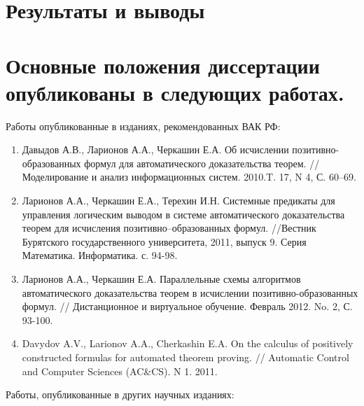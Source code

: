 \documentclass[a4paper]{report}
\begin{document}
\section*{Результаты и выводы}  %


\section*{Основные положения диссертации опубликованы в следующих работах.}

Работы опубликованные в изданиях, рекомендованных ВАК РФ:

\begin{enumerate}
\item Давыдов А.В., Ларионов А.А., Черкашин Е.А. Об исчислении
позитивно-образованных формул для автоматического доказательства
теорем. // Моделирование и анализ информационных систем. 2010.T. 17, N
4, С. 60--69.
\item Ларионов А.А., Черкашин Е.А., Терехин И.Н. Системные предикаты для
управления логическим выводом в системе автоматического доказательства
теорем для исчисления позитивно--образованных формул. //Вестник
Бурятского государственного университета, 2011, выпуск 9. Серия
Математика. Информатика. с. 94-98.
\item Ларионов А.А., Черкашин Е.А. Параллельные схемы алгоритмов
автоматического доказательства теорем в исчислении
позитивно-образованных формул. // Дистанционное и виртуальное
обучение. Февраль 2012. No. 2, С. 93-100.
\item Davydov A.V., Larionov A.A., Cherkashin E.A. On the calculus of
positively constructed formulas for automated theorem proving. //
Automatic Control and Computer Sciences (AC\&CS). N 1. 2011.
\end{enumerate}

Работы, опубликованные в других научных изданиях:
\end{document}
